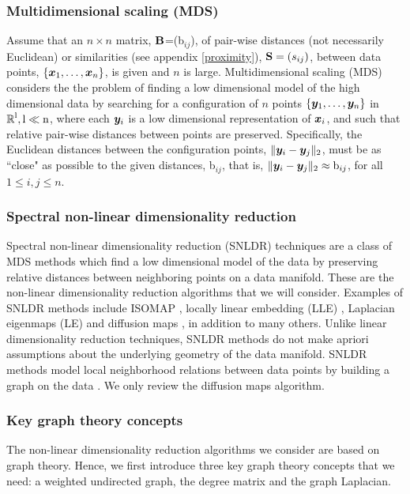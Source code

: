 \subsubsection{Multidimensional scaling (MDS)}
Assume that an $n\times n$ matrix, $\textbf{B}$=(b$_{ij}$), of pair-wise distances
(not necessarily Euclidean) or similarities (see appendix \ref{proximity}), $\textbf{S} = (s_{ij})$, between data points, $\{\boldsymbol{x}_{1}, \ldots, \boldsymbol{x}_{n} \}$, is given and $n$ is large.
Multidimensional scaling (MDS) \cite{CoxT2000, MardiaK.V1979Ma} considers the the problem of finding a low dimensional model of the high dimensional data by searching for a configuration of $n$ points $\{\boldsymbol{y}_{1}, \ldots, \boldsymbol{y}_{n} \}$ in $\operatorname{\mathbb{R}}^{\text{l}}, \text{l} \ll \text{n}$, where each $\boldsymbol{y}_{i}$ is a low dimensional representation of $\boldsymbol{x}_{i}$, and such that relative pair-wise distances between points are preserved. Specifically, the Euclidean distances between the configuration points, $\lVert\boldsymbol{y}_{i} - \boldsymbol{y}_{j}\rVert_{2}$, must be as ``close" as possible to  the given distances, b$_{ij}$, that is, $\lVert\boldsymbol{y}_{i} - \boldsymbol{y}_{j}\rVert_{2} \approx \text{b}_{ij}$, for all $1 \leq i, j \leq n$.

\subsubsection{Spectral non-linear dimensionality reduction}
Spectral non-linear dimensionality reduction (SNLDR) techniques are a 
class of MDS methods which find a low dimensional model of the data by preserving relative distances between neighboring points on a data manifold. These are the non-linear dimensionality
reduction algorithms that we will consider. Examples of SNLDR methods include ISOMAP \cite{TenenbaumJB2000Aggf}, locally linear embedding (LLE)  \cite{roweis2000nonlinear}, Laplacian eigenmaps (LE) \cite{belkin2003laplacian} and diffusion maps \cite{coifman2006diffusion}, in addition to many others. Unlike linear dimensionality reduction techniques, SNLDR methods do not make apriori assumptions about the underlying geometry of the data manifold.
SNLDR methods model local neighborhood relations between data points by building a graph on the data  \cite{Luxburg2007}. We only review the diffusion maps algorithm.


\subsubsection{Key graph theory concepts}
The non-linear dimensionality reduction algorithms we consider are based on graph theory. Hence, we first introduce three key graph theory concepts that we need: a weighted undirected graph, the degree matrix and the graph Laplacian.\\

